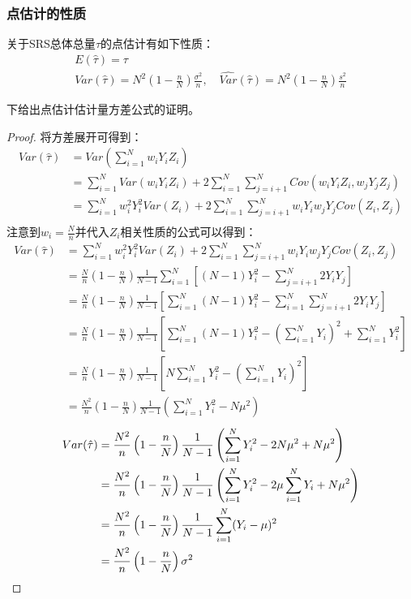 \subsubsection{点估计的性质}
\begin{theorem}
	关于SRS总体总量$\tau$的点估计有如下性质：
	\begin{gather*}
		E(\hat{\tau})=\tau \\ Var(\hat{\tau})=N^2\left(1-\frac{n}{N}\right)\frac{\sigma^2}{n},\quad
		\widehat{Var}(\hat{\tau})=N^2\left(1-\frac{n}{N}\right)\frac{s^2}{n}
	\end{gather*}
\end{theorem}
下给出点估计估计量方差公式的证明。
\begin{proof}
	将方差展开可得到：
	\begin{align*}
		Var(\hat{\tau})
		&=Var\left(\sum\limits_{i=1}^Nw_iY_iZ_i\right) \\
		&=\sum\limits_{i=1}^NVar(w_iY_iZ_i)+2\sum\limits_{i=1}^N\sum\limits_{j=i+1}^NCov(w_iY_iZ_i,w_jY_jZ_j) \\
		&=\sum\limits_{i=1}^Nw_i^2Y_i^2Var(Z_i)+2\sum\limits_{i=1}^N\sum\limits_{j=i+1}^Nw_iY_iw_jY_jCov(Z_i,Z_j) \\	
	\end{align*}	
	注意到$w_i=\frac{N}{n}$并代入$Z_i$相关性质的公式可以得到：
	\begin{align*}
		Var(\hat{\tau})
		&=\sum\limits_{i=1}^Nw_i^2Y_i^2Var(Z_i)+2\sum\limits_{i=1}^N\sum\limits_{j=i+1}^Nw_iY_iw_jY_jCov(Z_i,Z_j) \\
		&=\frac{N}{n}\left(1-\frac{n}{N}\right)\frac{1}{N-1}\sum\limits_{i=1}^{N}\left[(N-1)Y_i^2-\sum\limits_{j=i+1}^N2Y_iY_j\right] \\
		&=\frac{N}{n}\left(1-\frac{n}{N}\right)\frac{1}{N-1}\left[\sum\limits_{i=1}^{N}(N-1)Y_i^2-\sum\limits_{i=1}^{N}\sum\limits_{j=i+1}^N2Y_iY_j\right] \\
		&=\frac{N}{n}\left(1-\frac{n}{N}\right)\frac{1}{N-1}\left[\sum\limits_{i=1}^{N}(N-1)Y_i^2-\left(\sum\limits_{i=1}^NY_i\right)^2+\sum\limits_{i=1}^NY_i^2\right] \\
		&=\frac{N}{n}\left(1-\frac{n}{N}\right)\frac{1}{N-1}\left[N\sum\limits_{i=1}^{N}Y_i^2-\left(\sum\limits_{i=1}^NY_i\right)^2\right] \\
		&=\frac{N^2}{n}\left(1-\frac{n}{N}\right)\frac{1}{N-1}\left(\sum\limits_{i=1}^{N}Y_i^2-N\mu^2\right)
	\end{align*}
	\begin{align*}
		Var(\hat{\tau})
		&=\frac{N^2}{n}\left(1-\frac{n}{N}\right)\frac{1}{N-1}\left(\sum\limits_{i=1}^{N}Y_i^2-2N\mu^2+N\mu^2\right) \\
		&=\frac{N^2}{n}\left(1-\frac{n}{N}\right)\frac{1}{N-1}\left(\sum\limits_{i=1}^{N}Y_i^2-2\mu\sum\limits_{i=1}^NY_i+N\mu^2\right) \\     
		&=\frac{N^2}{n}\left(1-\frac{n}{N}\right)\frac{1}{N-1}\sum\limits_{i=1}^N(Y_i-\mu)^2 \\ 
		&=\frac{N^2}{n}\left(1-\frac{n}{N}\right)\sigma^2 \qedhere
	\end{align*}
\end{proof}
